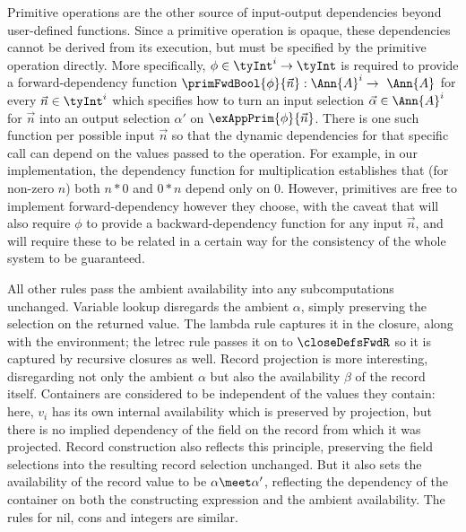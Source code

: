  Primitive operations are the other source of input-output dependencies beyond user-defined functions. Since a primitive operation is opaque, these dependencies cannot be derived from its execution, but must be specified by the primitive operation directly. More specifically, $\phi \in \tyInt^{i} \to \tyInt$ is required to provide a forward-dependency function $\primFwdBool{\phi}{\vec{n}}: \Ann{A}^i \to \Ann{A}$ for every $\vec{n} \in \tyInt^i$ which specifies how to turn an input selection $\vec{\alpha} \in \Ann{A}^i$ for $\vec{n}$ into an output selection $\alpha'$ on $\exAppPrim{\phi}{\vec{n}}$. There is one such function per possible input $\vec{n}$ so that the dynamic dependencies for that specific call can depend on the values passed to the operation. For example, in our implementation, the dependency function for multiplication establishes that (for non-zero $n$) both $n * 0$ and $0 * n$ depend only on $0$. However, primitives are free to implement forward-dependency however they choose, with the caveat that  will also require $\phi$ to provide a backward-dependency function for any input $\vec{n}$, and  will require these to be related in a certain way for the consistency of the whole system to be guaranteed.

 All other rules pass the ambient availability into any subcomputations unchanged. Variable lookup disregards the ambient $\alpha$, simply preserving the selection on the returned value. The lambda rule captures it in the closure, along with the environment; the letrec rule passes it on to $\closeDefsFwdR$ so it is captured by recursive closures as well. Record projection is more interesting, disregarding not only the ambient $\alpha$ but also the availability $\beta$ of the record itself. Containers are considered to be independent of the values they contain: here, $v_i$ has its own internal availability which is preserved by projection, but there is no implied dependency of the field on the record from which it was projected. Record construction also reflects this principle, preserving the field selections into the resulting record selection unchanged. But it also sets the availability of the record value to be $\alpha \meet \alpha'$, reflecting the dependency of the container on both the constructing expression and the ambient availability. The rules for nil, cons and integers are similar.

